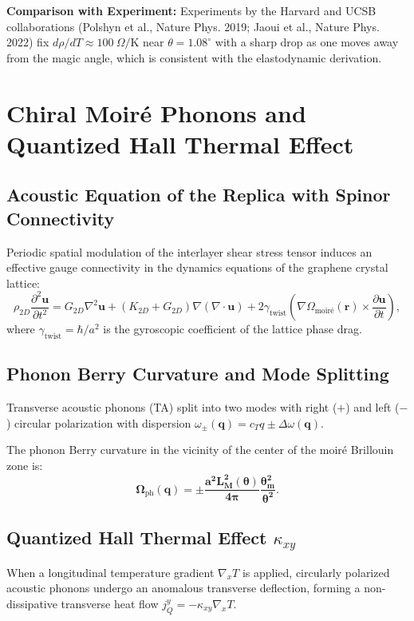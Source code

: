 \documentclass[12pt,a4paper]{article}
\begin{document}
\textbf{Comparison with Experiment:} Experiments by the Harvard and UCSB collaborations (Polshyn et al., Nature Phys. 2019; Jaoui et al., Nature Phys. 2022) fix $d\rho/dT \approx 100 \ \Omega/\text{K}$ near $\theta = 1.08^\circ$ with a sharp drop as one moves away from the magic angle, which is consistent with the elastodynamic derivation.
											
\section{Chiral Moiré Phonons and Quantized Hall Thermal Effect}
											
\subsection{Acoustic Equation of the Replica with Spinor Connectivity}
Periodic spatial modulation of the interlayer shear stress tensor induces an effective gauge connectivity in the dynamics equations of the graphene crystal lattice:
\begin{equation}
\rho_{2D} \frac{\partial^2 \mathbf{u}}{\partial t^2} = G_{2D} \nabla^2 \mathbf{u} + (K_{2D} + G_{2D}) \nabla(\nabla \cdot \mathbf{u}) + 2 \gamma_{\text{twist}} \left( \nabla \Omega_{\text{moir\'e}}(\mathbf{r}) \times \frac{\partial \mathbf{u}}{\partial t} \right),
\end{equation}
where $\gamma_{\text{twist}} = \hbar / a^2$ is the gyroscopic coefficient of the lattice phase drag.
											
\subsection{Phonon Berry Curvature and Mode Splitting}
Transverse acoustic phonons (TA) split into two modes with right ($+$) and left ($-$) circular polarization with dispersion $\omega_\pm(\mathbf{q}) = c_T q \pm \Delta\omega(\mathbf{q})$. 
											
The phonon Berry curvature in the vicinity of the center of the moiré Brillouin zone is:
\begin{equation}
\mathbf{\Omega_{\mathrm{ph}}(\mathbf{q}) = \pm \frac{a^2 L_M^2(\theta)}{4\pi} \frac{\theta_m^2}{\theta^2}}.
\end{equation}
											
\subsection{Quantized Hall Thermal Effect $\kappa_{xy}$}
When a longitudinal temperature gradient $\nabla_x T$ is applied, circularly polarized acoustic phonons undergo an anomalous transverse deflection, forming a non-dissipative transverse heat flow $j_Q^y = -\kappa_{xy} \nabla_x T$.
											
\end{document}
